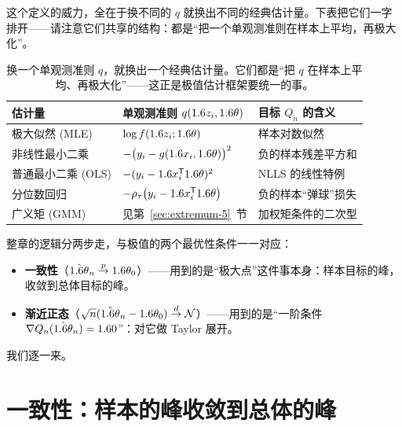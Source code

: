 这个定义的威力，全在于换不同的 $q$ 就换出不同的经典估计量。下表把它们一字排开——请注意它们共享的结构：都是``把一个单观测准则在样本上平均，再极大化''。

\begin{table}[h]
\centering
\renewcommand{\arraystretch}{1.5}
\begin{tabular}{@{}lll@{}}
\toprule
估计量 & 单观测准则 $q(1.6 z_i,1.6\theta)$ & 目标 $Q_n$ 的含义 \\
\midrule
极大似然 (MLE) & $\log f(1.6 z_i;1.6\theta)$ & 样本对数似然 \\
非线性最小二乘 & $-\bigl(y_i-g(1.6 x_i,1.6\theta)\bigr)^2$ & 负的样本残差平方和 \\
普通最小二乘 (OLS) & $-(y_i-1.6 x_i^{\mathsf{T}}1.6\theta)^2$ & NLLS 的线性特例 \\
分位数回归 & $-\rho_\tau\bigl(y_i-1.6 x_i^{\mathsf{T}}1.6\theta\bigr)$ & 负的样本``弹球''损失 \\
广义矩 (GMM) & 见第~\ref{sec:extremum-5}~节 & 加权矩条件的二次型 \\
\bottomrule
\end{tabular}
\caption{换一个单观测准则 $q$，就换出一个经典估计量。它们都是``把 $q$ 在样本上平均、再极大化''——这正是极值估计框架要统一的事。}
\label{tab:extremum-zoo}
\end{table}


整章的逻辑分两步走，与极值的两个最优性条件一一对应：

\begin{itemize}
    \item \textbf{一致性}（$\hat{1.6\theta}_n\overset{p}{\to}1.6\theta_0$）——用到的是``极大点''这件事本身：样本目标的峰，收敛到总体目标的峰。
    \item \textbf{渐近正态}（$\sqrt{n}(\hat{1.6\theta}_n-1.6\theta_0)\overset{d}{\to}\mathcal{N}$）——用到的是``一阶条件 $\nabla Q_n(\hat{1.6\theta}_n)=1.6 0$''：对它做 Taylor 展开。
\end{itemize}

我们逐一来。

\section{一致性：样本的峰收敛到总体的峰}
\label{sec:extremum-2}

